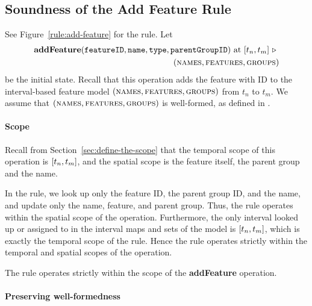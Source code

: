 \subsection{Soundness of the Add Feature Rule}
\label{sub:soundness-of-the-add-feature-rule}

See Figure~\vref{rule:add-feature} for the  rule.
Let 
\begin{equation*}
   \begin{split}
      \textbf{addFeature}(\var{featureID}, \var{name}, \var{type}, \var{parentGroupID})\text{ at }\interval{t_n}{t_m}
      \shove \\
   (\names{}, \features{}, \groups{})
\end{split}
\end{equation*}
be the initial state. Recall that this operation adds the feature with ID  to the interval-based feature model $(\textsc{names}{}, \textsc{features}{}, \textsc{groups}{}{})$ from $t_n$ to $t_m$. We assume that $(\textsc{names}{}, \textsc{features}{}, \textsc{groups}{}{})$ is well-formed, as defined in .

\paragraph{Scope}

Recall from Section~\vref{sec:define-the-scope} that the temporal scope of this operation is $\interval{t_n}{t_m}$, and the spatial scope is the feature itself, the parent group and the name. 

In the rule, we look up only the feature ID, the parent group ID, and the name, and update only the name, feature, and parent group. Thus, the rule operates within the spatial scope of the operation. Furthermore, the only interval looked up or assigned to in the interval maps and sets of the model is $\interval{t_n}{t_m}$, which is exactly the temporal scope of the rule. Hence the rule operates strictly within the temporal and spatial scopes of the operation.
\\

\begin{lemma}
   The  rule operates strictly within the scope of the \textbf{addFeature} operation.
   \label{lemma:add-feature-scope}
\end{lemma}


\paragraph{Preserving well-formedness}

